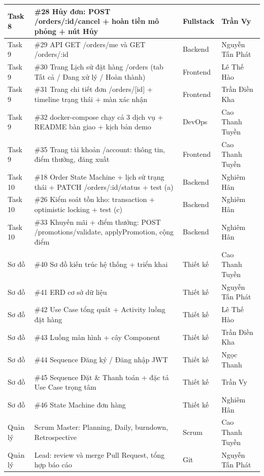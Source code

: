 \begin{longtable}{|p{2.3cm}|p{7.2cm}|p{1.6cm}|p{3.2cm}|}
Task 8 & \#28 Hủy đơn: POST /orders/:id/cancel + hoàn tiền mô phỏng + nút Hủy & Fullstack & Trần Vy \\ \hline
Task 9 & \#29 API GET /orders/me và GET /orders/:id & Backend & Nguyễn Tấn Phát \\ \hline
Task 9 & \#30 Trang Lịch sử đặt hàng /orders (tab Tất cả / Đang xử lý / Hoàn thành) & Frontend & Lê Thế Hào \\ \hline
Task 9 & \#31 Trang chi tiết đơn /orders/[id] + timeline trạng thái + màn xác nhận & Frontend & Trần Điền Kha \\ \hline
Task 9 & \#32 docker-compose chạy cả 3 dịch vụ + README bàn giao + kịch bản demo & DevOps & Cao Thanh Tuyền \\ \hline
Task 9 & \#35 Trang tài khoản /account: thông tin, điểm thưởng, đăng xuất & Frontend & Cao Thanh Tuyền \\ \hline
Task 10 & \#18 Order State Machine + lịch sử trạng thái + PATCH /orders/:id/status + test (a) & Backend & Nghiêm Hân \\ \hline
Task 10 & \#26 Kiểm soát tồn kho: transaction + optimistic locking + test (c) & Backend & Nghiêm Hân \\ \hline
Task 10 & \#33 Khuyến mãi + điểm thưởng: POST /promotions/validate, applyPromotion, cộng điểm & Backend & Nghiêm Hân \\ \hline
Sơ đồ & \#40 Sơ đồ kiến trúc hệ thống + triển khai & Thiết kế & Cao Thanh Tuyền \\ \hline
Sơ đồ & \#41 ERD cơ sở dữ liệu & Thiết kế & Nguyễn Tấn Phát \\ \hline
Sơ đồ & \#42 Use Case tổng quát + Activity luồng đặt hàng & Thiết kế & Lê Thế Hào \\ \hline
Sơ đồ & \#43 Luồng màn hình + cây Component & Thiết kế & Trần Điền Kha \\ \hline
Sơ đồ & \#44 Sequence Đăng ký / Đăng nhập JWT & Thiết kế & Ngọc Thanh \\ \hline
Sơ đồ & \#45 Sequence Đặt \& Thanh toán + đặc tả Use Case trọng tâm & Thiết kế & Trần Vy \\ \hline
Sơ đồ & \#46 State Machine đơn hàng & Thiết kế & Nghiêm Hân \\ \hline
Quản lý & Scrum Master: Planning, Daily, burndown, Retrospective & Scrum & Cao Thanh Tuyền \\ \hline
Quản lý & Lead: review và merge Pull Request, tổng hợp báo cáo & Git & Nguyễn Tấn Phát \\ \hline
\end{longtable}
